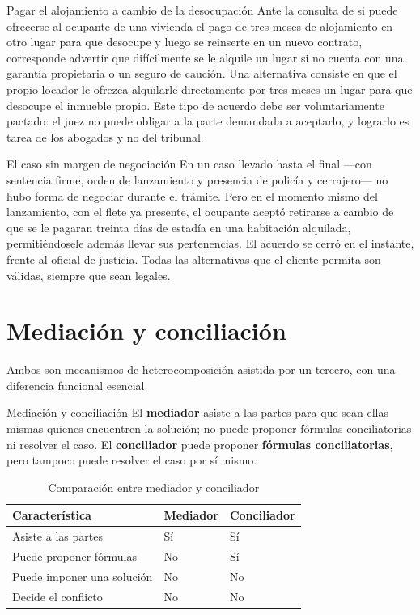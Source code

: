 \documentclass[12pt,oneside]{book}
\begin{document}
\begin{example}{Pagar el alojamiento a cambio de la desocupación}
Ante la consulta de si puede ofrecerse al ocupante de una vivienda el pago de tres meses de alojamiento en otro lugar para que desocupe y luego se reinserte en un nuevo contrato, corresponde advertir que difícilmente se le alquile un lugar si no cuenta con una garantía propietaria o un seguro de caución. Una alternativa consiste en que el propio locador le ofrezca alquilarle directamente por tres meses un lugar para que desocupe el inmueble propio. Este tipo de acuerdo debe ser voluntariamente pactado: el juez no puede obligar a la parte demandada a aceptarlo, y lograrlo es tarea de los abogados y no del tribunal.
\end{example}

\begin{example}{El caso sin margen de negociación}
En un caso llevado hasta el final ---con sentencia firme, orden de lanzamiento y presencia de policía y cerrajero--- no hubo forma de negociar durante el trámite. Pero en el momento mismo del lanzamiento, con el flete ya presente, el ocupante aceptó retirarse a cambio de que se le pagaran treinta días de estadía en una habitación alquilada, permitiéndosele además llevar sus pertenencias. El acuerdo se cerró en el instante, frente al oficial de justicia. Todas las alternativas que el cliente permita son válidas, siempre que sean legales.
\end{example}

\section{Mediación y conciliación}

Ambos son mecanismos de heterocomposición asistida por un tercero, con una diferencia funcional esencial.

\begin{definition}{Mediación y conciliación}
El \textbf{mediador} asiste a las partes para que sean ellas mismas quienes encuentren la solución; no puede proponer fórmulas conciliatorias ni resolver el caso. El \textbf{conciliador} puede proponer \textbf{fórmulas conciliatorias}, pero tampoco puede resolver el caso por sí mismo.
\end{definition}

\begin{table}[H]
\centering
\caption{Comparación entre mediador y conciliador}
\begin{tabularx}{\textwidth}{X >{\centering\arraybackslash}p{} >{\centering\arraybackslash}p{}}
\toprule
\textbf{Característica} & \textbf{Mediador} & \textbf{Conciliador} \\
\midrule
Asiste a las partes & Sí & Sí \\
Puede proponer fórmulas & No & Sí \\
Puede imponer una solución & No & No \\
Decide el conflicto & No & No \\
\bottomrule
\end{tabularx}
\end{table}
\end{document}
